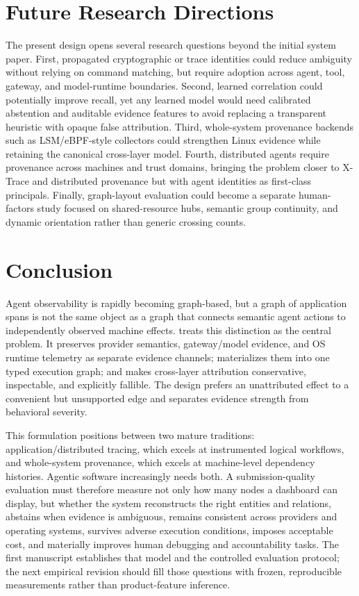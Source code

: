 \section{Future Research Directions}
The present design opens several research questions beyond the initial system paper. First, propagated cryptographic or trace identities could reduce ambiguity without relying on command matching, but require adoption across agent, tool, gateway, and model-runtime boundaries. Second, learned correlation could potentially improve recall, yet any learned model would need calibrated abstention and auditable evidence features to avoid replacing a transparent heuristic with opaque false attribution. Third, whole-system provenance backends such as LSM/eBPF-style collectors could strengthen Linux evidence while retaining the canonical cross-layer model. Fourth, distributed agents require provenance across machines and trust domains, bringing the problem closer to X-Trace and distributed provenance but with agent identities as first-class principals. Finally, graph-layout evaluation could become a separate human-factors study focused on shared-resource hubs, semantic group continuity, and dynamic orientation rather than generic crossing counts.

\section{Conclusion}
Agent observability is rapidly becoming graph-based, but a graph of application spans is not the same object as a graph that connects semantic agent actions to independently observed machine effects. \system treats this distinction as the central problem. It preserves provider semantics, gateway/model evidence, and OS runtime telemetry as separate evidence channels; materializes them into one typed execution graph; and makes cross-layer attribution conservative, inspectable, and explicitly fallible. The design prefers an unattributed effect to a convenient but unsupported edge and separates evidence strength from behavioral severity.

This formulation positions \system between two mature traditions: application/distributed tracing, which excels at instrumented logical workflows, and whole-system provenance, which excels at machine-level dependency histories. Agentic software increasingly needs both. A submission-quality evaluation must therefore measure not only how many nodes a dashboard can display, but whether the system reconstructs the right entities and relations, abstains when evidence is ambiguous, remains consistent across providers and operating systems, survives adverse execution conditions, imposes acceptable cost, and materially improves human debugging and accountability tasks. The first manuscript establishes that model and the controlled evaluation protocol; the next empirical revision should fill those questions with frozen, reproducible measurements rather than product-feature inference.
